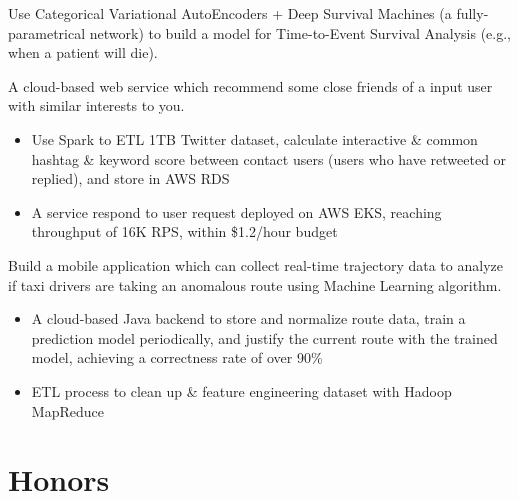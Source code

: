 \documentclass{resume}
\begin{document}
\begin{flushleft}
Use Categorical Variational AutoEncoders + Deep Survival Machines (a fully-parametrical network) to build a model for Time-to-Event Survival Analysis (e.g., when a patient will die).

A cloud-based web service which recommend some close friends of a input user with similar interests to you.
\begin{itemize}
    \item Use Spark to ETL 1TB Twitter dataset, calculate interactive \& common hashtag \& keyword score between contact users (users who have retweeted or replied), and store in AWS RDS
    \item A service respond to user request deployed on AWS EKS, reaching throughput of 16K RPS, within \$1.2/hour budget
\end{itemize}


Build a mobile application which can collect real-time trajectory data to analyze if taxi drivers are taking an anomalous route using Machine Learning algorithm.
\begin{itemize}
    \item A cloud-based Java backend to store and normalize route data, train a prediction model periodically, \linebreak and justify the current route with the trained model, achieving a correctness rate of over 90\%
    \item ETL process to clean up \& feature engineering dataset with Hadoop MapReduce
\end{itemize}
\end{flushleft}

\section{Honors}
\end{document}
